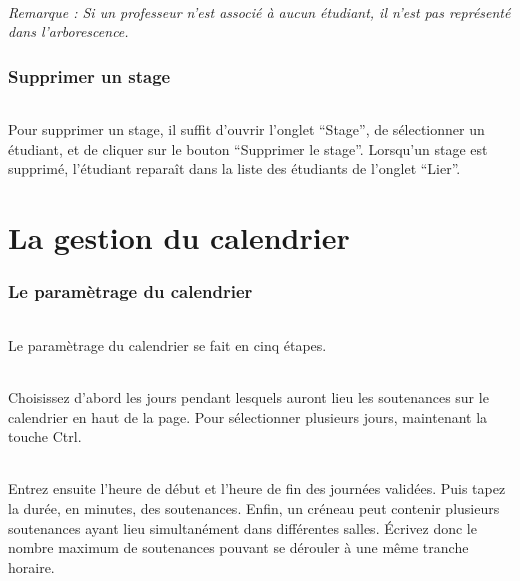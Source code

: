 \documentclass[a4paper,10pt]{book}
\begin{document}
	\paragraph{}
	  \textit{Remarque : Si un professeur n'est associé à aucun étudiant, il n'est pas représenté dans l'arborescence.}
      
    \section{Supprimer un stage}
      \paragraph{}
	Pour supprimer un stage, il suffit d'ouvrir l'onglet ``Stage'', de sélectionner un étudiant, et de cliquer sur le bouton ``Supprimer le stage''.
	Lorsqu'un stage est supprimé, l'étudiant reparaît dans la liste des étudiants de l'onglet ``Lier''.
    
    
\part{La gestion du calendrier}
  \setcounter{section}{0}
    \section{Le paramètrage du calendrier}
      \paragraph{}
	Le paramètrage du calendrier se fait en cinq étapes.
	
      \paragraph{}
	Choisissez d'abord les jours pendant lesquels auront lieu les soutenances sur le calendrier en haut de la page.
	Pour sélectionner plusieurs jours, maintenant la touche Ctrl.
      
      \paragraph{}
	Entrez ensuite l'heure de début et l'heure de fin des journées validées.
	Puis tapez la durée, en minutes, des soutenances.
	Enfin, un créneau peut contenir plusieurs soutenances ayant lieu simultanément dans différentes salles.
	Écrivez donc le nombre maximum de soutenances pouvant se dérouler à une même tranche horaire.
      
\end{document}
